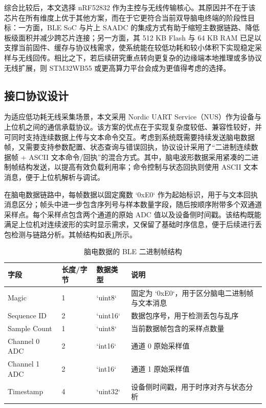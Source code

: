 综合比较后，本文选择 nRF52832 作为主控与无线传输核心。其原因并不在于该芯片在所有维度上优于其他方案，而在于它更符合当前双导脑电终端的阶段性目标：一方面，BLE SoC 与片上 SAADC 的集成方式有助于缩短主数据链路、降低板级面积并减少跨芯片连接；另一方面，其 512 KB Flash 与 64 KB RAM 已足以支撑当前固件、缓存与协议栈需求，使系统能在较低功耗和较小体积下实现稳定采样与无线回传。相比之下，若后续研究重点转向更复杂的边缘端本地推理或多协议无线扩展，则 STM32WB55 或更高算力平台会成为更值得考虑的选择。

\subsection{接口协议设计}

为适应低功耗无线采集场景，本文采用 Nordic UART Service（NUS）作为设备与上位机之间的通信承载协议。该方案的优点在于实现复杂度较低、兼容性较好，并可同时支持连续数据上传与文本命令交互。考虑到系统既需要持续发送脑电数据帧，又需要支持参数配置、状态查询与错误回执，协议设计采用了“二进制连续数据帧 + ASCII 文本命令/回执”的混合方式。其中，脑电波形数据采用紧凑的二进制帧结构发送，以提高有效负载利用率；命令控制与状态回执则使用 ASCII 文本消息，便于上位机解析与调试。

在脑电数据链路中，每帧数据以固定魔数 `0xE0` 作为起始标识，用于与文本回执消息区分；帧头中进一步包含序列号与样本数量字段，随后按顺序附带多个双通道采样点。每个采样点包含两个通道的原始 ADC 值以及设备侧时间戳。该结构既能满足上位机对连续波形的实时显示需求，又保留了基础时序信息，便于后续进行丢包检测与链路分析。其帧结构如表\ref{tab:c3_ble_frame}所示。

\begin{table}[htbp]
    \centering
    \caption{脑电数据的 BLE 二进制帧结构}
    \label{tab:c3_ble_frame}
    \begin{tabular}{p{3.0cm}p{2.0cm}p{2.5cm}p{6.0cm}}
        \hline
        字段 & 长度/字节 & 数据类型 & 说明 \\
        \hline
        Magic & 1 & `uint8` & 固定为 `0xE0`，用于区分脑电二进制帧与文本消息 \\
        Sequence ID & 2 & `uint16` & 数据包序号，用于检测丢包与乱序 \\
        Sample Count & 1 & `uint8` & 当前数据帧包含的采样点数量 \\
        Channel 0 ADC & 2 & `int16` & 通道 0 原始采样值 \\
        Channel 1 ADC & 2 & `int16` & 通道 1 原始采样值 \\
        Timestamp & 4 & `uint32` & 设备侧时间戳，用于时序对齐与状态分析 \\
        \hline
    \end{tabular}
\end{table}

